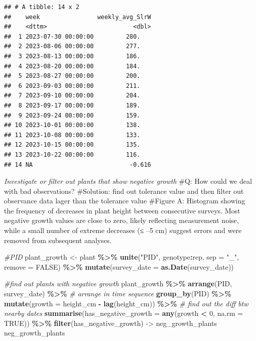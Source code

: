 \documentclass[
]{article}
\newenvironment{Shaded}{\begin{snugshade}}{\end{snugshade}}
\newcommand{\AttributeTok}[1]{\textcolor[rgb]{0.13,0.29,0.53}{#1}}
\newcommand{\CommentTok}[1]{\textcolor[rgb]{0.56,0.35,0.01}{\textit{#1}}}
\newcommand{\ConstantTok}[1]{\textcolor[rgb]{0.56,0.35,0.01}{#1}}
\newcommand{\DecValTok}[1]{\textcolor[rgb]{0.00,0.00,0.81}{#1}}
\newcommand{\FunctionTok}[1]{\textcolor[rgb]{0.13,0.29,0.53}{\textbf{#1}}}
\newcommand{\NormalTok}[1]{#1}
\newcommand{\OtherTok}[1]{\textcolor[rgb]{0.56,0.35,0.01}{#1}}
\newcommand{\SpecialCharTok}[1]{\textcolor[rgb]{0.81,0.36,0.00}{\textbf{#1}}}
\newcommand{\StringTok}[1]{\textcolor[rgb]{0.31,0.60,0.02}{#1}}
\begin{document}
\begin{verbatim}
## # A tibble: 14 x 2
##    week                weekly_avg_SlrW
##    <dttm>                        <dbl>
##  1 2023-07-30 00:00:00         280.   
##  2 2023-08-06 00:00:00         277.   
##  3 2023-08-13 00:00:00         186.   
##  4 2023-08-20 00:00:00         184.   
##  5 2023-08-27 00:00:00         200.   
##  6 2023-09-03 00:00:00         211.   
##  7 2023-09-10 00:00:00         204.   
##  8 2023-09-17 00:00:00         189.   
##  9 2023-09-24 00:00:00         159.   
## 10 2023-10-01 00:00:00         138.   
## 11 2023-10-08 00:00:00         133.   
## 12 2023-10-15 00:00:00         135.   
## 13 2023-10-22 00:00:00         116.   
## 14 NA                           -0.616
\end{verbatim}

\emph{Investigate or filter out plants that show negative growth} \#Q:
How could we deal with bad observations? \#Solution: find out tolerance
value and then filter out observance data lager than the tolerance value
\#Figure A: Histogram showing the frequency of decreases in plant height
between consecutive surveys. Most negative growth values are close to
zero, likely reflecting measurement noise, while a small number of
extreme decreases (≤ --5 cm) suggest errors and were removed from
subsequent analyses.

\begin{Shaded}
\begin{Highlighting}[]
\CommentTok{\#PID}
\NormalTok{plant\_growth }\OtherTok{\textless{}{-}}\NormalTok{ plant }\SpecialCharTok{\%\textgreater{}\%}
  \FunctionTok{unite}\NormalTok{(}\StringTok{"PID"}\NormalTok{, genotype}\SpecialCharTok{:}\NormalTok{rep, }\AttributeTok{sep =} \StringTok{"\_"}\NormalTok{, }\AttributeTok{remove =} \ConstantTok{FALSE}\NormalTok{) }\SpecialCharTok{\%\textgreater{}\%}
  \FunctionTok{mutate}\NormalTok{(}\AttributeTok{survey\_date =} \FunctionTok{as.Date}\NormalTok{(survey\_date))}

\CommentTok{\#find out plants with negative growth}
\NormalTok{plant\_growth }\SpecialCharTok{\%\textgreater{}\%}
  \FunctionTok{arrange}\NormalTok{(PID, survey\_date) }\SpecialCharTok{\%\textgreater{}\%}  \CommentTok{\# arrange in time sequence}
  \FunctionTok{group\_by}\NormalTok{(PID) }\SpecialCharTok{\%\textgreater{}\%}
  \FunctionTok{mutate}\NormalTok{(}\AttributeTok{growth =}\NormalTok{ height\_cm }\SpecialCharTok{{-}} \FunctionTok{lag}\NormalTok{(height\_cm)) }\SpecialCharTok{\%\textgreater{}\%}  \CommentTok{\# find out the diff btw nearby dates}
  \FunctionTok{summarise}\NormalTok{(}\AttributeTok{has\_negative\_growth =} \FunctionTok{any}\NormalTok{(growth }\SpecialCharTok{\textless{}} \DecValTok{0}\NormalTok{, }\AttributeTok{na.rm =} \ConstantTok{TRUE}\NormalTok{)) }\SpecialCharTok{\%\textgreater{}\%} 
  \FunctionTok{filter}\NormalTok{(has\_negative\_growth) }\OtherTok{{-}\textgreater{}}\NormalTok{ neg\_growth\_plants}
\NormalTok{neg\_growth\_plants}
\end{Highlighting}
\end{Shaded}
\end{document}
